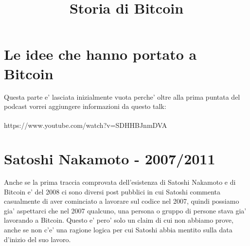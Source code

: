 \documentclass{article}
\title{Storia di Bitcoin}
\date{}
\begin{document}
\maketitle
\tableofcontents

\section{Le idee che hanno portato a Bitcoin}
Questa parte e' lasciata inizialmente vuota perche' oltre alla prima puntata del podcast vorrei aggiungere informazioni da questo talk: \\\\ https://www.youtube.com/watch?v=SDHHBJnmDVA

\section{Satoshi Nakamoto - 2007/2011}
Anche se la prima traccia comprovata dell'esistenza di Satoshi Nakamoto e di Bitcoin e' del 2008 ci sono diversi post pubblici in cui Satoshi commenta casualmente di aver cominciato a lavorare sul codice nel 2007, quindi possiamo gia' aspettarci che nel 2007 qualcuno, una persona o gruppo di persone stava gia' lavorando a Bitcoin. Questo e' pero' solo un claim di cui non abbiamo prove, anche se non c'e' una ragione logica per cui Satoshi abbia mentito sulla data d'inizio del suo lavoro.
\end{document}

